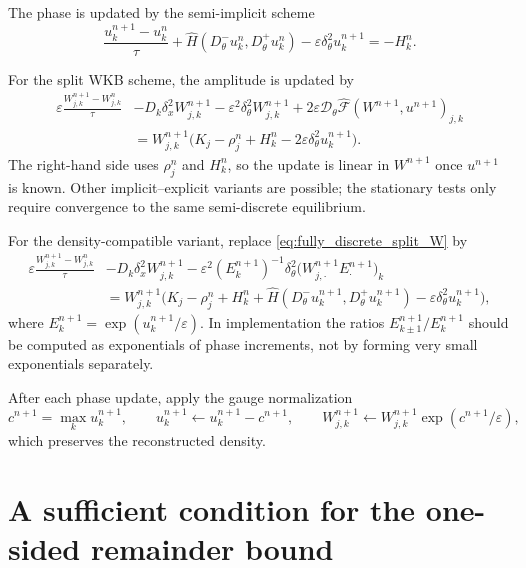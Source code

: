 \documentclass[11pt]{article}
\begin{document}
The phase is updated by the semi-implicit scheme
\[
    \frac{u_k^{n+1}-u_k^n}{\tau}
    +
    \widehat H
    \left(D_\theta^-u_k^n,D_\theta^+u_k^n\right)
    -
    \varepsilon\delta_\theta^2u_k^{n+1}
    =
    -H_k^n .
\]

For the split WKB scheme, the amplitude is updated by
\begin{equation}\label{eq:fully_discrete_split_W}
\begin{aligned}
\varepsilon
\frac{W_{j,k}^{n+1}-W_{j,k}^n}{\tau}
&-
D_k\delta_x^2W_{j,k}^{n+1}
-
\varepsilon^2\delta_\theta^2W_{j,k}^{n+1}
+
2\varepsilon
\mathcal D_\theta
\widehat{\mathcal F}(W^{n+1},u^{n+1})_{j,k}
\\
&=
W_{j,k}^{n+1}
\bigl(
K_j-\rho_j^n
+H_k^n
-2\varepsilon\delta_\theta^2u_k^{n+1}
\bigr).
\end{aligned}
\end{equation}
The right-hand side uses \(\rho_j^n\) and \(H_k^n\), so the update is linear in
\(W^{n+1}\) once \(u^{n+1}\) is known. Other implicit--explicit variants are
possible; the stationary tests only require convergence to the same
semi-discrete equilibrium.

For the density-compatible variant, replace \eqref{eq:fully_discrete_split_W}
by
\begin{equation}\label{eq:fully_discrete_density_compatible}
\begin{aligned}
\varepsilon
\frac{W_{j,k}^{n+1}-W_{j,k}^n}{\tau}
&-
D_k\delta_x^2W_{j,k}^{n+1}
-
\varepsilon^2(E_k^{n+1})^{-1}
\delta_\theta^2
\bigl(W_{j,\cdot}^{n+1}E_\cdot^{n+1}\bigr)_k
\\
&=
W_{j,k}^{n+1}
\bigl(
K_j-\rho_j^n
+H_k^n
+\widehat H(D_\theta^-u_k^{n+1},D_\theta^+u_k^{n+1})
-\varepsilon\delta_\theta^2u_k^{n+1}
\bigr),
\end{aligned}
\end{equation}
where \(E_k^{n+1}=\exp(u_k^{n+1}/\varepsilon)\). In implementation the ratios
\(E_{k\pm1}^{n+1}/E_k^{n+1}\) should be computed as exponentials of phase
increments, not by forming very small exponentials separately.

After each phase update, apply the gauge normalization
\[
    c^{n+1}=\max_k u_k^{n+1},
    \qquad
    u_k^{n+1}\leftarrow u_k^{n+1}-c^{n+1},
    \qquad
    W_{j,k}^{n+1}\leftarrow W_{j,k}^{n+1}\exp(c^{n+1}/\varepsilon),
\]
which preserves the reconstructed density.

\section{A sufficient condition for the one-sided remainder bound}
\label{append:remainder_condition}
\end{document}
